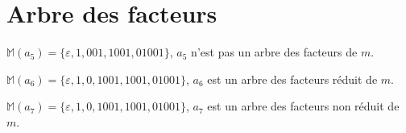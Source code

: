 \section{Arbre des facteurs}
\begin{Exercise}
$\mathbb{M}(a_5)=\{\varepsilon, 1, 001, 1001, 01001\}$, $a_5$ n'est pas un arbre des facteurs de $m$.

$\mathbb{M}(a_6)=\{\varepsilon, 1, 0, 1 001, 1001, 01001\}$, $a_6$ est un arbre des facteurs réduit de $m$.

$\mathbb{M}(a_7)=\{\varepsilon, 1, 0, 1 001, 1001, 01001\}$, $a_7$ est un arbre des facteurs non réduit de $m$.
\end{Exercise} 

